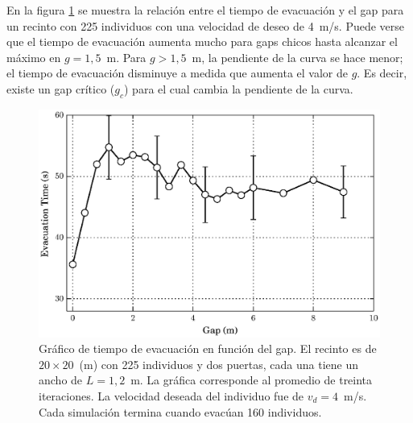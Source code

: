 En la figura \ref{gap_vste_225_v4} se muestra la relación entre el tiempo de evacuación y el gap para un recinto con 225 individuos con una velocidad de deseo de 4~m/s. Puede verse que el tiempo de evacuación aumenta mucho para gaps chicos hasta alcanzar el máximo en $g=1,5$~m. Para $g>1,5$~m, la pendiente de la curva se hace menor; el tiempo de evacuación disminuye a medida que aumenta el valor de $g$. 
Es decir, existe un gap crítico ($g_c$) para el cual cambia la pendiente de la curva.

\begin{figure}[H]
    \centering
    \includegraphics[scale=0.8]{figuras/gap_vste_225_v4_big.eps}
    \caption[width=5cm]{Gráfico de tiempo de evacuación en función del gap. El recinto es de $20\times 20$~(m) con 225 individuos y dos puertas, cada una tiene un ancho de $L=1,2$~m. La gráfica corresponde al promedio de treinta iteraciones. La velocidad deseada del individuo fue de $v_d=4$~m/s. Cada simulación termina cuando evacúan 160 individuos.}
    \label{gap_vste_225_v4}
\end{figure}


